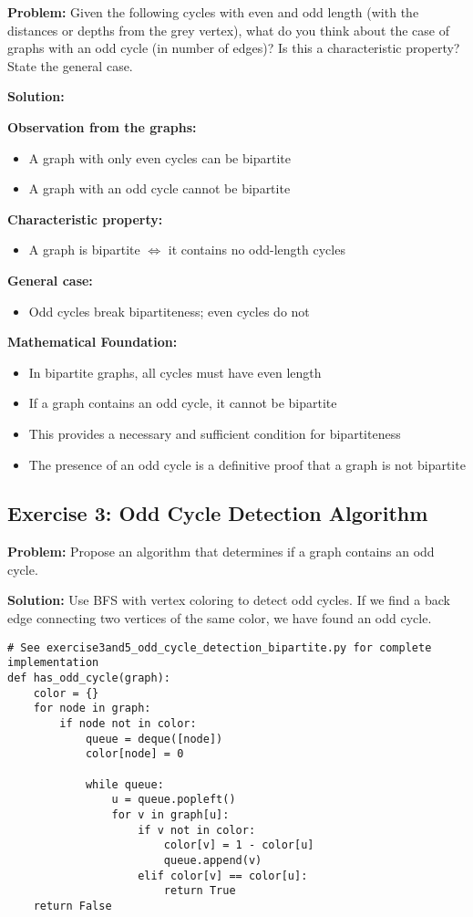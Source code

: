 \documentclass[12pt,a4paper]{article}
\begin{document}
\textbf{Problem:} Given the following cycles with even and odd length (with the distances or depths from the grey vertex), what do you think about the case of graphs with an odd cycle (in number of edges)? Is this a characteristic property? State the general case.

\textbf{Solution:} 

\textbf{Observation from the graphs:}
\begin{itemize}
    \item A graph with only even cycles can be bipartite
    \item A graph with an odd cycle cannot be bipartite
\end{itemize}

\textbf{Characteristic property:}
\begin{itemize}
    \item A graph is bipartite $\Leftrightarrow$ it contains no odd-length cycles
\end{itemize}

\textbf{General case:}
\begin{itemize}
    \item Odd cycles break bipartiteness; even cycles do not
\end{itemize}

\textbf{Mathematical Foundation:}
\begin{itemize}
    \item In bipartite graphs, all cycles must have even length
    \item If a graph contains an odd cycle, it cannot be bipartite
    \item This provides a necessary and sufficient condition for bipartiteness
    \item The presence of an odd cycle is a definitive proof that a graph is not bipartite
\end{itemize}

\subsection{Exercise 3: Odd Cycle Detection Algorithm}

\textbf{Problem:} Propose an algorithm that determines if a graph contains an odd cycle.

\textbf{Solution:} Use BFS with vertex coloring to detect odd cycles. If we find a back edge connecting two vertices of the same color, we have found an odd cycle.

\begin{lstlisting}[caption=Odd Cycle Detection, label=lst:odd_cycle]
# See exercise3and5_odd_cycle_detection_bipartite.py for complete implementation
def has_odd_cycle(graph):
    color = {}
    for node in graph:
        if node not in color:
            queue = deque([node])
            color[node] = 0
            
            while queue:
                u = queue.popleft()
                for v in graph[u]:
                    if v not in color:
                        color[v] = 1 - color[u]
                        queue.append(v)
                    elif color[v] == color[u]:
                        return True
    return False
\end{lstlisting}
\end{document}
